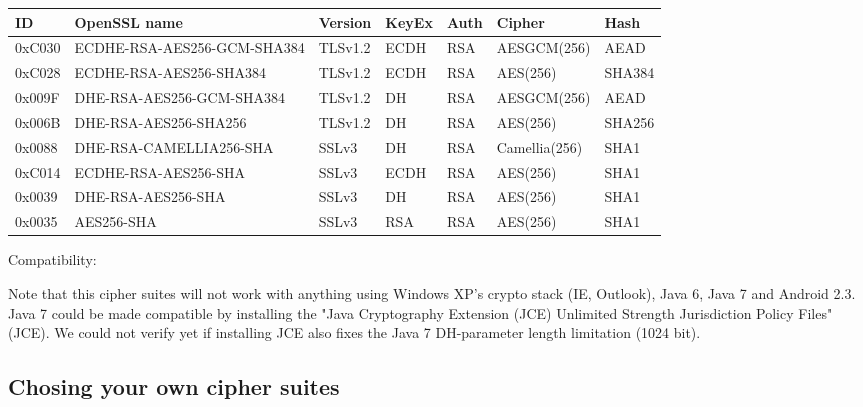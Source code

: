 \begin{center}
\begin{tabular}{| l | l | l | l | l| l | l |}
\hline
ID        & OpenSSL name			    & Version & KeyEx & Auth & Cipher & Hash \\ \hline
0xC030 & ECDHE-RSA-AES256-GCM-SHA384 & TLSv1.2 & ECDH  &  RSA &AESGCM(256)  & AEAD   \\ \hline
0xC028 & ECDHE-RSA-AES256-SHA384     & TLSv1.2 & ECDH  &  RSA &AES(256)     & SHA384 \\ \hline
0x009F & DHE-RSA-AES256-GCM-SHA384   & TLSv1.2 & DH    &  RSA &AESGCM(256)  & AEAD   \\ \hline
0x006B & DHE-RSA-AES256-SHA256       & TLSv1.2 & DH    &  RSA &AES(256)     & SHA256 \\ \hline
0x0088 & DHE-RSA-CAMELLIA256-SHA     & SSLv3   & DH    &  RSA &Camellia(256)& SHA1   \\ \hline
0xC014 & ECDHE-RSA-AES256-SHA        & SSLv3   & ECDH  &  RSA &AES(256)     & SHA1   \\ \hline
0x0039 & DHE-RSA-AES256-SHA          & SSLv3   & DH    &  RSA &AES(256)     & SHA1   \\ \hline
0x0035 & AES256-SHA                  & SSLv3   & RSA   &  RSA &AES(256)     & SHA1   \\ \hline

\end{tabular}
\end{center}

Compatibility:

Note that this cipher suites will not work with anything using Windows XP's crypto stack (IE, Outlook), Java 6, Java 7 and Android 2.3. Java 7 could be made compatible by installing the "Java Cryptography Extension (JCE) Unlimited Strength Jurisdiction Policy Files" (JCE). We could not verify yet if installing JCE also fixes the Java 7 DH-parameter length limitation (1024 bit). 



\subsection{Chosing your own cipher suites}
\label{section:ChosingYourOwnCipherSuites}

